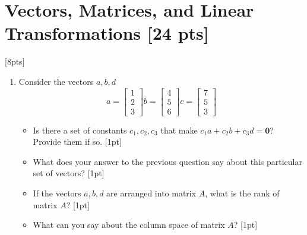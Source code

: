 \documentclass[11pt]{article}
\begin{document}
\section{Vectors, Matrices, and Linear Transformations [24 pts]}

\vspace{2em}
 [8pts]
\begin{enumerate}[label=\alph*.]
  \setlength\itemsep{2em}
  \item Consider the vectors $a, b, d$
  \[
    a = \begin{bmatrix}1 \\ 2 \\ 3\end{bmatrix}
    b = \begin{bmatrix}4 \\ 5 \\ 6\end{bmatrix}
    c = \begin{bmatrix}7 \\ 5 \\ 3\end{bmatrix}
  \]
  \begin{itemize}
    \setlength\itemsep{2em}
    \item Is there a set of constants ${c_1, c_2, c_3}$ that make $c_1a + c_2b + c_3d = \mathbf{0}$? Provide them if so. [1pt]
    \item What does your answer to the previous question say about this particular set of vectors? [1pt]
    \item If the vectors $a, b, d$ are arranged into matrix $A$, what is the rank of matrix $A$? [1pt]
    \item What can you say about the column space of matrix $A$? [1pt]
  \end{itemize}


\end{enumerate}
\end{document}
